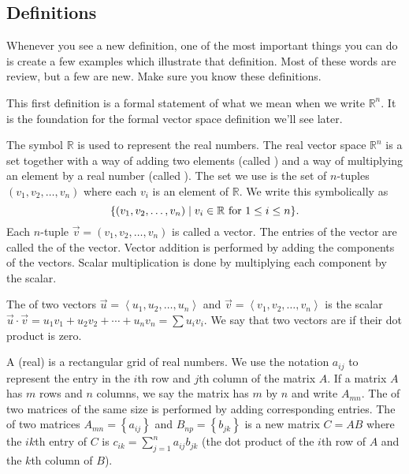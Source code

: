 \subsection{Definitions}

Whenever you see a new definition, one of the most important things you can do is create a few examples which illustrate that definition.  Most of these words are review, but a few are new.  Make sure you know these definitions.

This first definition is a formal statement of what we mean when we write $\mathbb{R}^n$.  It is the foundation for the formal vector space definition we'll see later.
\begin{definition}
The symbol $\mathbb{R}$ is used to represent the real numbers.  
The real vector space $\mathbb{R}^n$ is a set together with a way of adding two elements (called ) and a way of multiplying an element by a real number (called ).  
The set we use is the set of $n$-tuples $(v_1,v_2,\ldots, v_n)$ where each $v_i$ is an element of $\mathbb{R}$. 
We write this symbolically as 
$$
\{ (v_1,v_2,\ldots, v_n)\mid v_i\in \mathbb{R} \text{ for } 1\leq i\leq n\}.$$
Each $n$-tuple $\vec v = (v_1,v_2,\ldots, v_n)$ is called a vector. 
The entries of the vector are called the  of the vector.  Vector addition is performed by adding the components of the vectors. Scalar multiplication is done by multiplying each component by the scalar. 
\end{definition}


\begin{definition} 
%
\label{def dot product}
The  of two vectors $\vec u = \left<u_1,u_2,\ldots,u_n\right>$ and $\vec v =\left<v_1,v_2,\ldots,v_n\right>$ is the scalar $\vec u\cdot \vec v = u_1v_1+u_2v_2+\cdots+u_nv_n = \sum u_iv_i$. We say that two vectors are  if their dot product is zero.
\end{definition}

\begin{definition} \label{def matrix product} 
A (real)  is a rectangular grid of real numbers.
We use the notation $a_{ij}$ to represent the entry in the $i$th row and $j$th column of the matrix $A$.  
If a matrix $A$ has $m$ rows and $n$ columns, we say the matrix has  $m$ by $n$ and write $A_{mn}$. 
The  of two matrices of the same size is performed by adding corresponding entries.  
The  of two matrices $A_{m n} = \left\{a_{ij}\right\}$ and $B_{np} =\left\{b_{jk}\right\}$ is a new matrix $C=AB$ where the $ik$th entry of $C$ is $c_{ik}=\sum_{j=1}^n a_{ij}b_{jk}$ (the dot product of the $i$th row of $A$ and the $k$th column of $B$).
\end{definition}

